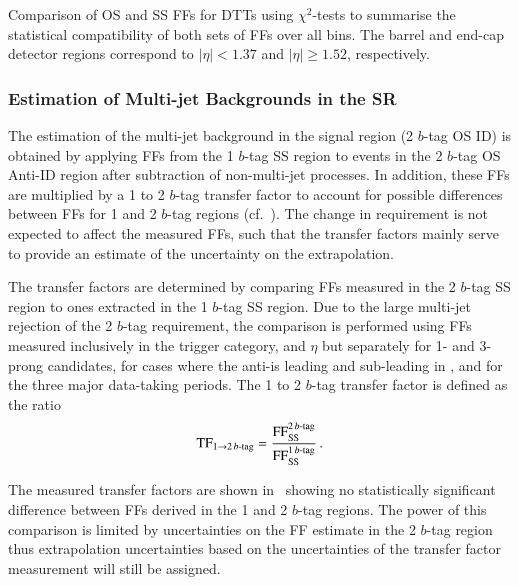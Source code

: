\begin{table}[htbp]
  \centering

  \caption{Comparison of OS and SS FFs for DTTs using $\chi^2$-tests to
    summarise the statistical compatibility of both sets of FFs over all
    \tauhadvis \pT bins. The barrel and end-cap detector regions correspond to
    \tauhadvis $|\eta| < 1.37$ and $|\eta| \geq 1.52$, respectively.}%
  \label{tab:fake_factor_osss_chi2test}

  
\end{table}


\subsubsection{Estimation of Multi-jet Backgrounds in the \hadhad SR}

The estimation of the multi-jet background in the \hadhad signal region (2
$b$-tag OS ID) is obtained by applying FFs from the 1 $b$-tag SS region to
events in the 2 $b$-tag OS Anti-ID region after subtraction of non-multi-jet
processes. In addition, these FFs are multiplied by a 1 to 2 $b$-tag transfer
factor to account for possible differences between FFs for 1 and 2 $b$-tag
regions (cf.\ ). The change in \btag requirement is
not expected to affect the measured FFs, such that the transfer factors mainly
serve to provide an estimate of the uncertainty on the extrapolation.

The transfer factors are determined by comparing FFs measured in the 2 $b$-tag
SS region to ones extracted in the 1 $b$-tag SS region. Due to the large
multi-jet rejection of the 2 $b$-tag requirement, the comparison is performed
using FFs measured inclusively in the trigger category, \tauhadvis \pT and
\tauhadvis $\eta$ but separately for 1- and 3-prong \tauhadvis candidates, for
cases where the anti-\tauhadvis is leading and sub-leading in \pT, and for the
three major data-taking periods. The 1 to 2 $b$-tag transfer factor is defined
as the ratio
\begin{align*}
  \text{TF}_{1 \rightarrow 2\,b\text{-tag}} = \frac{\text{FF}_{\text{SS}}^{2\,b\text{-tag}}}{\text{FF}_{\text{SS}}^{1\,b\text{-tag}}} \,\text{.}
\end{align*}

The measured transfer factors are shown in~
showing no statistically significant difference between FFs derived in the 1 and
2 $b$-tag regions. The power of this comparison is limited by uncertainties on
the FF estimate in the 2 $b$-tag region thus extrapolation uncertainties based
on the uncertainties of the transfer factor measurement will still be assigned.

